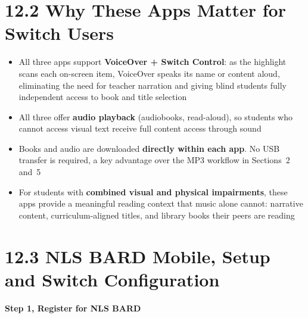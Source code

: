 \documentclass[justified,openright]{tufte-book}
\begin{document}

\section{12.2 Why These Apps Matter for Switch
Users}\label{why-accessible-reading-apps-matter}


\begin{itemize}

\item
  All three apps support \textbf{VoiceOver + Switch Control}: as the
  highlight scans each on-screen item, VoiceOver speaks its name or
  content aloud, eliminating the need for teacher narration and
  giving blind students fully independent access to book and title
  selection
\item
  All three offer \textbf{audio playback} (audiobooks, read-aloud), so
  students who cannot access visual text receive full content access
  through sound
\item
  Books and audio are downloaded \textbf{directly within each app}. No
  USB transfer is required, a key advantage over the MP3 workflow in
  Sections~2 and~5
\item
  For students with \textbf{combined visual and physical impairments},
  these apps provide a meaningful reading context that music alone
  cannot: narrative content, curriculum-aligned titles, and library
  books their peers are reading
\end{itemize}

\section{12.3 NLS BARD Mobile, Setup and Switch
Configuration}\label{nls-bard-setup}


\textbf{Step 1, Register for NLS BARD}
\end{document}
